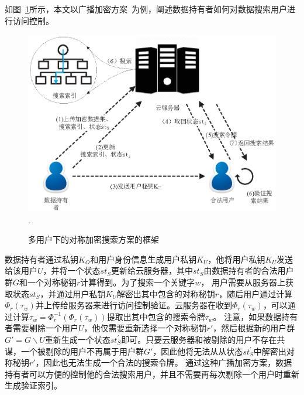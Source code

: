 如图~\ref{fig:MSSE}所示，本文以广播加密方案~\cite{curtmola2011searchable}为例，阐述数据持有者如何对数据搜索用户进行访问控制。
\begin{figure}[h]
\centering
\includegraphics[width=6 in]{fig/MSSE}
\DeclareGraphicsExtensions.
\caption{多用户下的对称加密搜索方案的框架}
\label{fig:MSSE}
\end{figure}

数据持有者通过私钥$K_O$和用户身份信息生成用户私钥$K_U$，他将用户私钥$K_U$发送给该用户$U$，并将一个状态$st_S$更新给云服务器，其中$st_S$由数据持有者的合法用户群$G$和一个对称秘钥$r$计算得到。为了搜索一个关键字$w$， 用户需要从服务器上获取状态$st_S$，并通过用户私钥$K_U$解密出其中包含的对称秘钥$r$，随后用户通过计算$\Phi_r(\tau_w)$并上传给服务器来进行访问控制验证。云服务器在收到$\Phi_r(\tau_w)$，可以通过计算$\tau_w = \Phi_r^{-1}(\Phi_r(\tau_w))$提取出其中包含的搜索令牌$\tau_w$。
注意，如果数据持有者需要剔除一个用户$U$，他仅需要重新选择一个对称秘钥$r'$，然后根据新的用户群$G'= G \backslash U$重新生成一个状态$st^{'}_S$即可。只要云服务器和被剔除的用户不存在共谋，一个被剔除的用户不再属于用户群$G'$，因此他将无法从从状态$st^{'}_S$中解密出对称秘钥$r'$，因此也无法生成一个合法的搜索令牌。
通过这种广播加密方案，数据持有者可以方便的控制他的合法搜索用户，并且不需要再每次剔除一个用户时重新生成验证索引。

